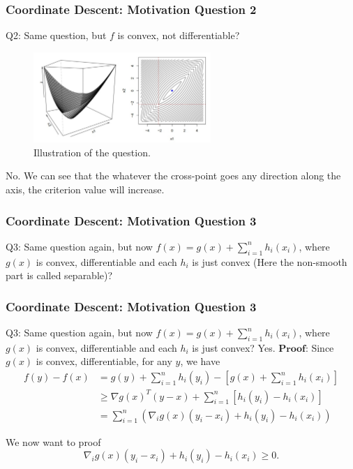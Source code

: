 \begin{frame}
    \frametitle{Coordinate Descent: Motivation Question 2}
Q2: Same question, but $f$ is convex, not differentiable?
\pause
\begin{figure}[!htbp]
    \begin{center}
        \includegraphics[width=0.6\textwidth]{img/cd_q2.png}
    \end{center}
    \caption{Illustration of the question.}\label{fig:cd_q2}
\end{figure}

No. We can see that the whatever the cross-point goes any direction along the axis, the criterion value will increase.
\end{frame}

\begin{frame}
\frametitle{Coordinate Descent: Motivation Question 3}
Q3: Same question again, but now $f(x)=g(x)+\sum_{i=1}^n h_i\left(x_i\right)$, where $g(x)$ is convex, differentiable and each $h_i$ is just convex (Here the non-smooth part is called separable)?
\end{frame}

\begin{frame}
\frametitle{Coordinate Descent: Motivation Question 3}
Q3: Same question again, but now $f(x)=g(x)+\sum_{i=1}^n h_i\left(x_i\right)$, where $g(x)$ is convex, differentiable and each $h_i$ is just convex?
\newline\newline
Yes. $\textbf{Proof}$: Since $g(x)$ is convex, differentiable, for any $y$, we have
\begin{align*}
    f(y)-f(x)&=g(y)+\sum_{i=1}^n h_i\left(y_i\right)-\left[g(x)+\sum_{i=1}^n h_i\left(x_i\right)\right] \\
    &\geq \nabla g(x)^T(y-x)+\sum_{i=1}^n\left[h_i\left(y_i\right)-h_i\left(x_i\right)\right]\\
    &=\sum_{i=1}^n\left(\nabla_i g(x)\left(y_i-x_i\right)+h_i\left(y_i\right)-h_i\left(x_i\right)\right)
\end{align*}

We now want to proof
$$\nabla_i g(x)\left(y_i-x_i\right)+h_i\left(y_i\right)-h_i\left(x_i\right) \geq 0.$$
\end{frame}

